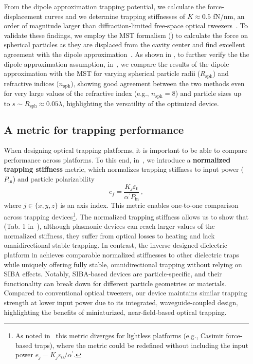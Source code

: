 From the dipole approximation trapping potential, we calculate the force-displacement curves and we determine trapping stiffnesses
of $K \approx 0.5$ fN/nm, an order of magnitude larger than diffraction-limited free-space optical tweezers~\cite{ownpub1}. To validate these findings,
we employ the MST formalism () to calculate the force on spherical particles as they are displaced from the cavity center and find excellent
agreement with the dipole approximation~\cite{ownpub1}. As shown in , to further verify the the dipole approximation assumption, in~\cite{ownpub3}, we compare the results of the dipole approximation with the MST
for varying spherical particle radii ($R_\text{sph}$) and refractive indices ($n_\text{sph}$), showing good agreement between the two methods
even for very large values of the refractive index (e.g., $n_\text{sph}=8$) and particle sizes up to $s \sim R_\text{sph}\approx 0.05 \lambda$, highlighting the versatility of the optimized device.

\subsection*{A metric for trapping performance~\cite{ownpub1}}

When designing optical trapping platforms, it is important to be able to compare performance across platforms. To this end, in~\cite{ownpub1}, we introduce a \textbf{normalized
trapping stiffness} metric, which normalizes trapping stiffness to input power ($P_\text{in}$) and particle  polarizability
\begin{equation}
 e_j=\frac{K_j \varepsilon_0}{\alpha^\prime P_{\text{in}}}\,,
\end{equation}
where $j \in \lbrace x,y,z \rbrace$ is an axis index. This metric enables one-to-one comparison across trapping devices\footnote{As noted in~\cite{ownpub1} this metric diverges for lightless platforms (e.g., Casimir force-based traps), where the metric could be redefined
without including the input power $e_j=K_j \varepsilon_0/\alpha^\prime$.}. The normalized trapping stiffness allows us to show that (Tab. 1 in~\cite{ownpub1}), although plasmonic devices can reach larger values of the normalized 
stiffness, they suffer from optical losses to heating and lack omnidirectional stable trapping. In contrast, the inverse-designed dielectric platform in 
 achieves comparable normalized stiffnesses to other dielectric traps while uniquely offering fully stable, omnidirectional trapping
 without relying on SIBA effects. Notably, SIBA-based devices are particle-specific, and their functionality can break down
 for different particle geometries or materials. Compared to conventional optical tweezers, our device maintains similar trapping
 strength at lower input power due to its integrated, waveguide-coupled design, highlighting the benefits of miniaturized,
 near-field-based optical trapping.

